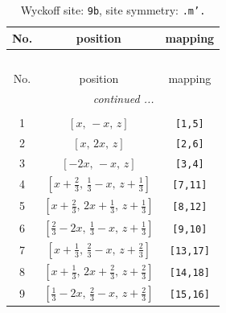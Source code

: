 \documentclass[fleqn,8pt]{jsarticle}
\begin{document}
\begin{longtable}{ccc}
\caption{Wyckoff site: {\tt 9b}, site symmetry: {\tt .m'.}}
 \\
 \hline \hline
No. & position & mapping \\ \hline \endfirsthead

\multicolumn{2}{l}{\tablename\ \thetable{}} \\
 \hline \hline
No. & position & mapping \\ \hline \endhead

 \hline \hline
\multicolumn{2}{r}{\footnotesize\it continued ...} \\ \endfoot

 \hline \hline
\multicolumn{2}{r}{} \\ \endlastfoot

1 & $\left[ x,\, - x,\, z \right]$ & {\tt [1,5]} \\ \hline
2 & $\left[ x,\, 2 x,\, z \right]$ & {\tt [2,6]} \\ \hline
3 & $\left[ - 2 x,\, - x,\, z \right]$ & {\tt [3,4]} \\ \hline
4 & $\left[ x + \frac{2}{3},\, \frac{1}{3} - x,\, z + \frac{1}{3} \right]$ & {\tt [7,11]} \\ \hline
5 & $\left[ x + \frac{2}{3},\, 2 x + \frac{1}{3},\, z + \frac{1}{3} \right]$ & {\tt [8,12]} \\ \hline
6 & $\left[ \frac{2}{3} - 2 x,\, \frac{1}{3} - x,\, z + \frac{1}{3} \right]$ & {\tt [9,10]} \\ \hline
7 & $\left[ x + \frac{1}{3},\, \frac{2}{3} - x,\, z + \frac{2}{3} \right]$ & {\tt [13,17]} \\ \hline
8 & $\left[ x + \frac{1}{3},\, 2 x + \frac{2}{3},\, z + \frac{2}{3} \right]$ & {\tt [14,18]} \\ \hline
9 & $\left[ \frac{1}{3} - 2 x,\, \frac{2}{3} - x,\, z + \frac{2}{3} \right]$ & {\tt [15,16]} \\
\end{longtable}
\renewcommand{\arraystretch}{1.2}
\end{document}
